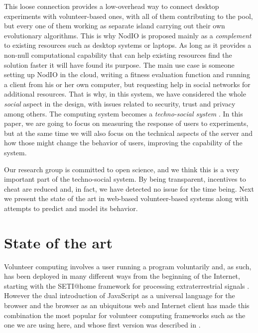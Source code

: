 \documentclass[letterpaper]{article}
\begin{document}
This loose connection provides a low-overhead way to connect desktop
experiments with volunteer-based ones, with all of them contributing
to the pool, but every one of them working as separate island 
carrying out their own evolutionary algorithms. This is why NodIO is
proposed mainly as a {\em complement} to existing resources such as
desktop systems or laptops. As long as it provides a non-null
computational capability that can help existing resources find the
solution faster it will have found its purpose. The main use case is
someone setting up NodIO in the cloud, writing a fitness evaluation
function and running a client from his or her own computer, but
requesting help in social networks for additional resources. That is
why, in this system,  we have considered the whole {\em social} aspect
in the design, with issues related to security, trust and privacy
among others. The computing system becomes a {\em techno-social
  system} \citep{vespignani2009predicting}. In this paper, we are going
to focus on measuring the response of users to experiments, but at the
same time we will also focus on the technical aspects of the server and how
those might change the behavior of users, improving the capability of %
the system.

Our research group is committed to open science, and we think this is
a very important part of the techno-social system. By being
transparent, incentives to cheat are reduced and, in fact, we have
detected no issue for the time being. Next we present the state of the art in web-based
volunteer-based systems along with attempts to predict and model its
behavior. 


\section{State of the art}
\label{sec:soa}

Volunteer computing involves a user running a program voluntarily
and, as such, has been deployed in many different ways from the
beginning of the Internet, starting with the SETI@home framework for
processing extraterrestrial signals \citep{david-seti:home}. However
the dual introduction of JavaScript as a universal language for the
browser and the browser as an ubiquitous web and Internet client has
made this combination the most popular for volunteer computing
frameworks such as the one we are using here, and whose first version
was described in \citep{DBLP:conf/gecco/GuervosG15}.
\end{document}
